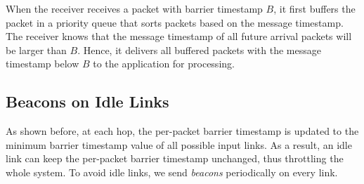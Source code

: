 When the receiver receives a packet with barrier timestamp $B$, it first buffers the packet in a priority queue that sorts packets based on the message timestamp. The receiver knows that the message timestamp of all future arrival packets will be larger than $B$. Hence, it delivers all buffered packets with the message timestamp below $B$ to the application for processing.






\subsection{Beacons on Idle Links}
\label{sec:beacon}

As shown before, at each hop, the per-packet barrier timestamp is updated to the minimum barrier timestamp value of all possible input links.
As a result, an idle link can keep the per-packet barrier timestamp unchanged, thus throttling the whole system.
To avoid idle links, we send \textit{beacons} periodically on every link.



